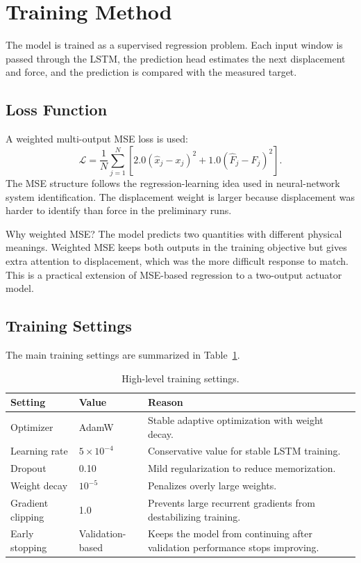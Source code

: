 \documentclass[11pt]{article}
\begin{document}
\section{Training Method}
The model is trained as a supervised regression problem. Each input window is passed through the LSTM, the prediction head estimates the next displacement and force, and the prediction is compared with the measured target.

\subsection{Loss Function}
A weighted multi-output MSE loss is used:
\begin{equation}
\mathcal{L}=\frac{1}{N}\sum_{j=1}^{N}\left[2.0(\hat{x}_j-x_j)^2+1.0(\hat{F}_j-F_j)^2\right].
\end{equation}
The MSE structure follows the regression-learning idea used in neural-network system identification. The displacement weight is larger because displacement was harder to identify than force in the preliminary runs.

\begin{trainbox}{Why weighted MSE?}
The model predicts two quantities with different physical meanings. Weighted MSE keeps both outputs in the training objective but gives extra attention to displacement, which was the more difficult response to match. This is a practical extension of MSE-based regression to a two-output actuator model.
\end{trainbox}

\subsection{Training Settings}
The main training settings are summarized in Table~\ref{tab:training_summary}.

\begin{table}[H]
\centering
\small
\begin{tabular}{p{4cm}p{3cm}p{7cm}}
\toprule
Setting & Value & Reason \\
\midrule
Optimizer & AdamW & Stable adaptive optimization with weight decay. \\
Learning rate & $5\times10^{-4}$ & Conservative value for stable LSTM training. \\
Dropout & 0.10 & Mild regularization to reduce memorization. \\
Weight decay & $10^{-5}$ & Penalizes overly large weights. \\
Gradient clipping & 1.0 & Prevents large recurrent gradients from destabilizing training. \\
Early stopping & Validation-based & Keeps the model from continuing after validation performance stops improving. \\
\bottomrule
\end{tabular}
\caption{High-level training settings.}
\label{tab:training_summary}
\end{table}
\end{document}

